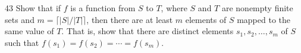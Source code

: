 \documentclass[11pt]{article}
\begin{document}
\begin{exercise}{43}
    Show that if $f$ is a function from $S$ to $T$, where $S$ and $T$
    are nonempty finite sets and $m = \lceil |S|/|T| \rceil$, then
    there are at least $m$ elements of $S$ mapped to the same value
    of $T$. That is, show that there are distinct elements
    $s_1, s_2, \dots, s_m$ of $S$ such that
    $f(s_1) = f(s_2) = \cdots = f(s_m)$.
\end{exercise}
\end{document}
